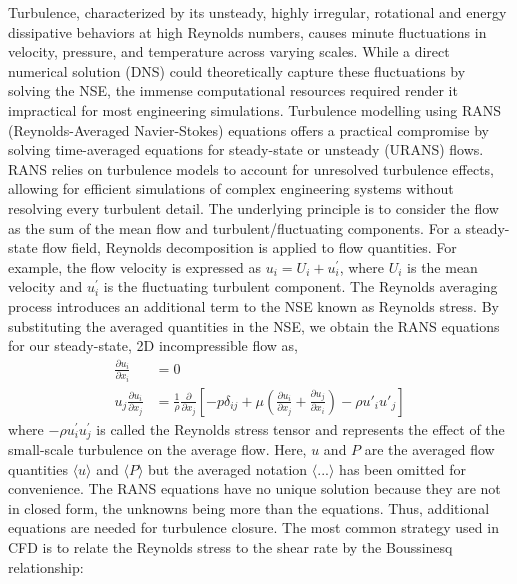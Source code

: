 Turbulence, characterized by its unsteady, highly irregular, rotational and energy dissipative behaviors at high Reynolds numbers, causes minute fluctuations in velocity, pressure, and temperature across varying scales. While a direct numerical solution (DNS) could theoretically capture these fluctuations by solving the \gls{NSE}, the immense computational resources required render it impractical for most engineering simulations. 
Turbulence modelling using RANS (Reynolds-Averaged Navier-Stokes) equations offers a practical compromise by solving time-averaged equations for steady-state or unsteady (URANS) flows. RANS relies on turbulence models to account for unresolved turbulence effects, allowing for efficient simulations of complex engineering systems without resolving every turbulent detail. The underlying principle is to consider the flow as the sum of the mean flow and turbulent/fluctuating components. For a steady-state flow field, Reynolds decomposition is applied to flow quantities. For example, the flow velocity is expressed as $u_i = U_i + u_i^{\prime}$, where $U_i$ is the mean velocity and $u_i^{\prime}$ is the fluctuating turbulent component. The Reynolds averaging process introduces an additional term to the \gls{NSE} known as Reynolds stress. By substituting the averaged quantities in the \gls{NSE}, we obtain the RANS equations for our steady-state, 2D incompressible flow as,
\begin{equation}
  \begin{aligned}
  \frac{\partial u_i}{\partial x_i}&=0 \\
  u_j \frac{\partial u_i}{\partial x_j}&=\frac{1}{\rho}\frac{\partial}{\partial x_j}     \left[-p \delta_{i j}+\mu \left(\frac{\partial u_i}{\partial x_j}+\frac{\partial u_j}{\partial x_i}\right) - \rho u'_i u'_j \right]
  \end{aligned}
\end{equation}
where $- \rho u_i^{\prime} u_j^{\prime}$ is called the Reynolds stress tensor and represents the effect of the small-scale turbulence on the average flow. Here, $u$ and $P$ are the averaged flow quantities $\langle u \rangle $ and $\langle P \rangle $ but the averaged notation $\langle ... \rangle $ has been omitted for convenience. The RANS equations have no unique solution because they are not in closed form, the unknowns being more than the equations. Thus, additional equations are needed for turbulence closure. The most common strategy used in CFD is to relate the Reynolds stress to the shear rate by the Boussinesq relationship:
